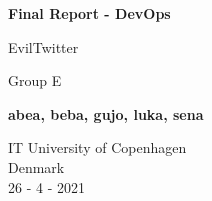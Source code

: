 \begin{titlepage}
    \begin{center}
        \vspace*{1cm}
            
        \Huge
        \textbf{Final Report - DevOps}
            
        \vspace{0.5cm}
        \LARGE
        EvilTwitter
            
        \vspace{1.5cm}
        
        Group E
        
        \textbf{abea, beba, gujo, luka, sena}
            
        \vfill
            
            
        \vspace{0.5cm}
            
          

        \Large
        IT University of Copenhagen\\
        Denmark\\
        26 - 4 - 2021
            
    \end{center}
\end{titlepage}